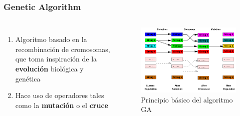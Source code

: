 \begin{frame}
  \frametitle{Genetic Algorithm}
  \begin{columns}
    \begin{enumerate}
      \item Algoritmo basado en la recombinación de cromosomas, que toma inspiración de la \textbf{evolución} biológica y genética
      \item Hace uso de operadores tales como la \textbf{mutación} o el \textbf{cruce}
    \end{enumerate}
    \begin{figure}
      \begin{center}
        \includegraphics[width=\textwidth]{imagenes/chapter3/ga-working-principle.png}
      \end{center}
      \caption{Principio básico del algoritmo GA \footnotemark[7]}
    \end{figure}
  \end{columns}
\end{frame}

